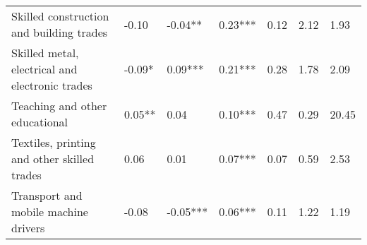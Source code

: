 \begin{tabular}{lllllll}
Skilled construction and building trades & -0.10 & -0.04** & 0.23*** & 0.12 & 2.12 & 1.93 \\
Skilled metal, electrical and electronic trades & -0.09* & 0.09*** & 0.21*** & 0.28 & 1.78 & 2.09 \\
Teaching and other educational & 0.05** & 0.04 & 0.10*** & 0.47 & 0.29 & 20.45 \\
Textiles, printing and other skilled trades & 0.06 & 0.01 & 0.07*** & 0.07 & 0.59 & 2.53 \\
Transport and mobile machine drivers & -0.08 & -0.05*** & 0.06*** & 0.11 & 1.22 & 1.19 \\
\bottomrule
\end{tabular}

